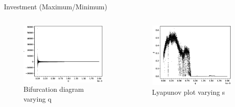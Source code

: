 \documentclass{beamer}
\begin{document}
\begin{frame}{Investment (Maximum/Minimum)}
	\begin{columns}
	\begin{column}{0.5\textwidth}
		\begin{figure}
			\centering
			\includegraphics[width=1.2\textwidth]{qbifurcation.eps}
			\caption{Bifurcation diagram varying q}
		\end{figure}
	\end{column}
	\begin{column}{0.5\textwidth}
		\begin{figure}
			\centering
			\includegraphics[width=1.2\textwidth]{qlyplot.eps}
			\caption{Lyapunov plot varying s}
		\end{figure}
	\end{column}
	\end{columns}
\end{frame}
\end{document}
